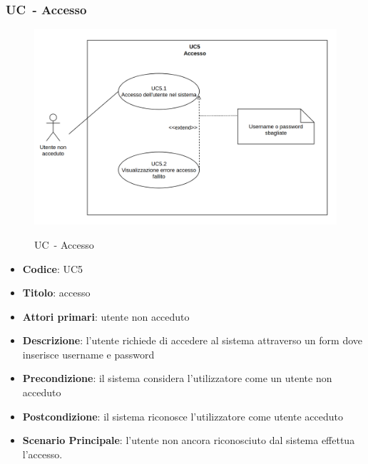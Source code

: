
\subsubsection{UC\theuccount\ - Accesso}
		\begin{figure}[H]
			\centering
				\includegraphics[width=\columnwidth]{img/UC5.png}\\
			\caption{UC\theuccount\ - Accesso}
		\end{figure}
	\begin{itemize}
		\item \textbf{Codice}: UC5
		\item \textbf{Titolo}: accesso
		\item \textbf{Attori primari}: utente non acceduto
		\item \textbf{Descrizione}: l'utente richiede di accedere al sistema attraverso un form dove inserisce username e password
		\item \textbf{Precondizione}: il sistema considera l’utilizzatore come un utente non acceduto
		\item \textbf{Postcondizione}: il sistema riconosce l'utilizzatore come utente acceduto
		\item \textbf{Scenario Principale}: l'utente non ancora riconosciuto dal sistema effettua l'accesso.
	\end{itemize}
	
